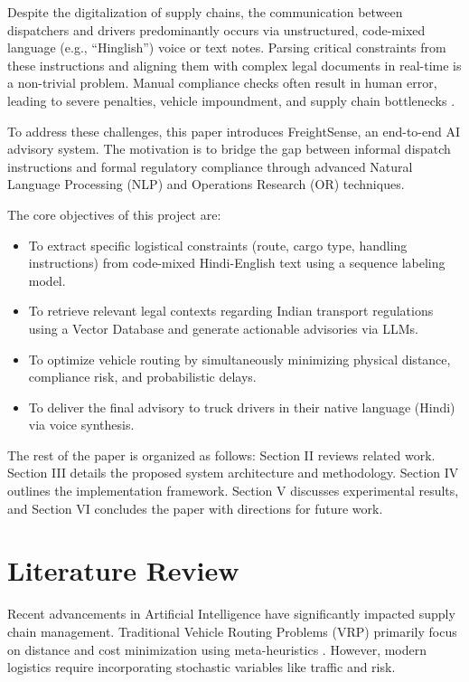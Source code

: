 \documentclass[conference]{IEEEtran}
\begin{document}
Despite the digitalization of supply chains, the communication between dispatchers and drivers predominantly occurs via unstructured, code-mixed language (e.g., ``Hinglish'') voice or text notes. Parsing critical constraints from these instructions and aligning them with complex legal documents in real-time is a non-trivial problem. Manual compliance checks often result in human error, leading to severe penalties, vehicle impoundment, and supply chain bottlenecks \cite{compliance_risk}.

To address these challenges, this paper introduces FreightSense, an end-to-end AI advisory system. The motivation is to bridge the gap between informal dispatch instructions and formal regulatory compliance through advanced Natural Language Processing (NLP) and Operations Research (OR) techniques.

The core objectives of this project are:
\begin{itemize}
    \item To extract specific logistical constraints (route, cargo type, handling instructions) from code-mixed Hindi-English text using a sequence labeling model.
    \item To retrieve relevant legal contexts regarding Indian transport regulations using a Vector Database and generate actionable advisories via LLMs.
    \item To optimize vehicle routing by simultaneously minimizing physical distance, compliance risk, and probabilistic delays.
    \item To deliver the final advisory to truck drivers in their native language (Hindi) via voice synthesis.
\end{itemize}

The rest of the paper is organized as follows: Section II reviews related work. Section III details the proposed system architecture and methodology. Section IV outlines the implementation framework. Section V discusses experimental results, and Section VI concludes the paper with directions for future work.

\section{Literature Review}
Recent advancements in Artificial Intelligence have significantly impacted supply chain management. Traditional Vehicle Routing Problems (VRP) primarily focus on distance and cost minimization using meta-heuristics \cite{vrp_traditional}. However, modern logistics require incorporating stochastic variables like traffic and risk. 
\end{document}
